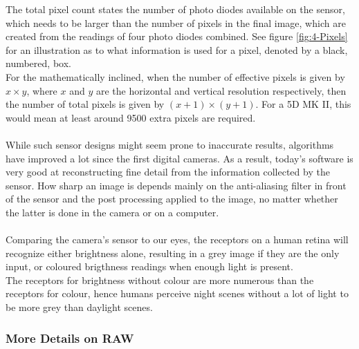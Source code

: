 The total pixel count states the number of photo diodes available on the \gls{sensor}, which needs to be larger than the number of pixels in the final image, which are created from the readings of four photo diodes combined. See figure \ref{fig:4-Pixels} for an illustration as to what information is used for a pixel, denoted by a black, numbered, box.
\\
For the mathematically inclined, when the number of effective pixels is given by $x \times y$, where $x$ and $y$ are the horizontal and vertical resolution respectively, then the number of total pixels is given by $\left( x +1 \right) \times \left(y + 1 \right)$. For a 5D MK II, this would mean at least around 9500 extra pixels are required.
\\
\\
While such sensor designs might seem prone to inaccurate results, algorithms have improved a lot since the first digital cameras. As a result, today's software is very good at reconstructing fine detail from the information collected by the \gls{sensor}. How sharp an image is depends mainly on the anti-aliasing filter in front of the sensor and the post processing applied to the image, no matter whether the latter is done in the camera or on a computer.
\\
\\
Comparing the camera's \gls{sensor} to our eyes, the receptors on a human retina will recognize either brightness alone, resulting in a grey image if they are the only input, or coloured brigthness readings when enough light is present.
\\
The receptors for brightness without colour are more numerous than the receptors for colour, hence humans perceive night scenes without a lot of light to be more grey than daylight scenes.


\subsubsection{More Details on RAW}

